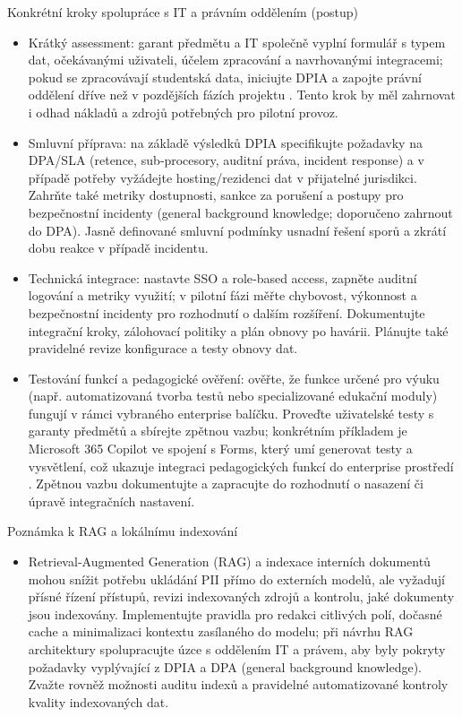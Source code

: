 Konkrétní kroky spolupráce s IT a právním oddělením (postup)
\begin{itemize}
\item Krátký assessment: garant předmětu a IT společně vyplní formulář s typem dat, očekávanými uživateli, účelem zpracování a navrhovanými integracemi; pokud se zpracovávají studentská data, iniciujte DPIA a zapojte právní oddělení dříve než v pozdějších fázích projektu \cite{kb_malinka_chatgpt_ve_vyuce_dva_roky_pote_2024_pdf_90bc3aaf_page_12_1}. Tento krok by měl zahrnovat i odhad nákladů a zdrojů potřebných pro pilotní provoz.
\item Smluvní příprava: na základě výsledků DPIA specifikujte požadavky na DPA/SLA (retence, sub‑procesory, auditní práva, incident response) a v případě potřeby vyžádejte hosting/rezidenci dat v přijatelné jurisdikci. Zahrňte také metriky dostupnosti, sankce za porušení a postupy pro bezpečnostní incidenty (general background knowledge; doporučeno zahrnout do DPA). Jasně definované smluvní podmínky usnadní řešení sporů a zkrátí dobu reakce v případě incidentu.
\item Technická integrace: nastavte SSO a role‑based access, zapněte auditní logování a metriky využití; v pilotní fázi měřte chybovost, výkonnost a bezpečnostní incidenty pro rozhodnutí o dalším rozšíření. Dokumentujte integrační kroky, zálohovací politiky a plán obnovy po havárii. Plánujte také pravidelné revize konfigurace a testy obnovy dat.
\item Testování funkcí a pedagogické ověření: ověřte, že funkce určené pro výuku (např. automatizovaná tvorba testů nebo specializované edukační moduly) fungují v rámci vybraného enterprise balíčku. Proveďte uživatelské testy s garanty předmětů a sbírejte zpětnou vazbu; konkrétním příkladem je Microsoft 365 Copilot ve spojení s Forms, který umí generovat testy a vysvětlení, což ukazuje integraci pedagogických funkcí do enterprise prostředí \cite{kb_ai_101_tipu_pdf_04e4a115_page_36_1}. Zpětnou vazbu dokumentujte a zapracujte do rozhodnutí o nasazení či úpravě integračních nastavení.
\end{itemize}

Poznámka k RAG a lokálnímu indexování
\begin{itemize}
\item Retrieval‑Augmented Generation (RAG) a indexace interních dokumentů mohou snížit potřebu ukládání PII přímo do externích modelů, ale vyžadují přísné řízení přístupů, revizi indexovaných zdrojů a kontrolu, jaké dokumenty jsou indexovány. Implementujte pravidla pro redakci citlivých polí, dočasné cache a minimalizaci kontextu zasílaného do modelu; při návrhu RAG architektury spolupracujte úzce s oddělením IT a právem, aby byly pokryty požadavky vyplývající z DPIA a DPA (general background knowledge). Zvažte rovněž možnosti auditu indexů a pravidelné automatizované kontroly kvality indexovaných dat.
\end{itemize}

